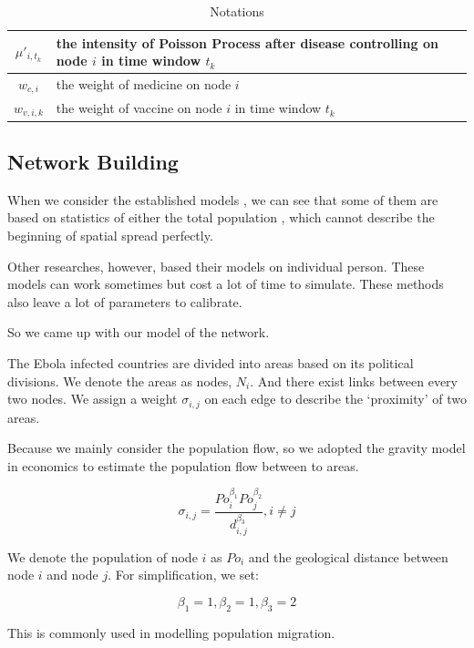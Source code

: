 \documentclass[11pt]{article}
\begin{document}
\begin{table}[hbtp]
\begin{center}
\begin{tabular}{|c|p{9cm} |}
\hline
$\mu'_{i,t_k}$ & the intensity of Poisson Process after disease controlling on node $i$ in time window $t_k$ \\

\hline
$w_{c,i}$ & the weight of medicine on node $i$  \\

\hline
$w_{v,i,k}$ & the weight of vaccine on node $i$ in time window $t_k$ \\


\hline
\end{tabular}
\end{center}
\caption{Notations}
\label{testtable}
\end{table}


\subsection{Network Building}


When we consider the established models , we can see that some of them are based on statistics of either the total population\cite{althaus2014estimating} , which cannot describe the beginning of spatial spread perfectly. 

Other researches\cite{lewnard2014dynamics}, however, based their models on individual person. These models can work sometimes but cost a lot of time to simulate. These methods also leave a lot of parameters to calibrate. 

So we came up with our model of the network.

The Ebola infected countries are divided into areas based on its political divisions. We denote the areas as nodes, $N_i$. And there exist links between every two nodes. We assign a weight $\sigma_{i,j}$ on each edge to describe the `proximity' of two areas. 
 
Because we mainly consider the population flow, so we adopted the gravity model\cite{anderson2010gravity}\cite{karemera2000gravity} in economics to estimate the population flow between to areas.

$$\sigma_{i,j} = \frac{Po_i^{\beta_1}Po_j^{\beta_2}}{d_{i,j}^{\beta_3}}, i \neq j$$

We denote the population of node $i$ as $Po_i$ and the geological distance between node $i$ and node $j$. For simplification, we set:

$$\beta_1 = 1, \beta_2 = 1, \beta_3 = 2$$

This is commonly used in modelling population migration.
\end{document}
